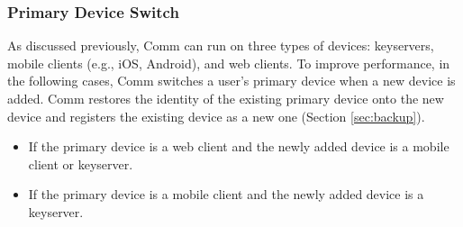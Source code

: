 \documentclass{article}
\newcommand{\sk}{{\sf sk}}
\newcommand{\bkdata}{{\sf BackupDataKey}}
\newcommand{\sign}{\sf Sign}
\newcommand{\verify}{\sf Verify}
\newcommand{\aesenc}{\sf AEAD.Enc}
\newcommand{\aesdec}{\sf AEAD.Dec}
\newcommand{\ct}{\sf ct}
\newcommand{\isk}{{\sf IdSecKey}}
\newcommand{\ipk}{{\sf IdPubKey}}
\newcommand{\dl}{{\sf DeviceList}}
\newcommand{\isequal}{\stackrel{?}{=}}
\newcommand{\userdata}{{\sf UserData}}
\begin{document}

\subsubsection{Primary Device Switch}
\label{proto:primarydeviceswitch}

As discussed previously, Comm can run on three types of devices: keyservers, mobile clients (e.g., iOS, Android), and web clients.  To improve performance, in the following cases, Comm switches a user's primary device when a new device is added. Comm restores the identity of the existing primary device onto the new device and registers the existing device as a new one (Section \ref{sec:backup}).

\begin{itemize}
    \item If the primary device is a web client and the newly added device is a mobile client or keyserver.
    \item If the primary device is a mobile client and the newly added device is a keyserver.
\end{itemize}
\end{document}
